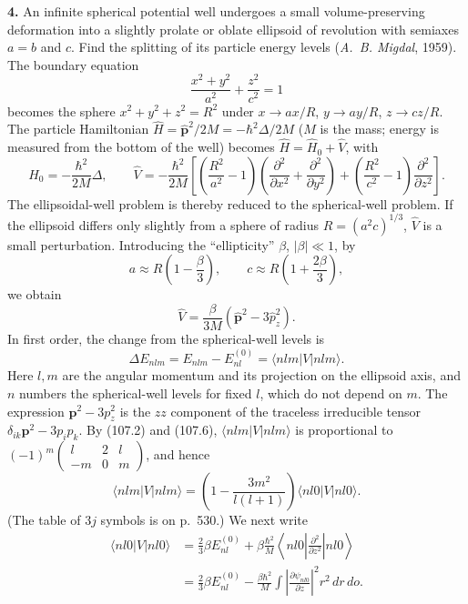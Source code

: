 \textbf{4.} An infinite spherical potential well undergoes a small
volume-preserving deformation into a slightly prolate or oblate ellipsoid of
revolution with semiaxes $a=b$ and $c$. Find the splitting of its particle
energy levels (\emph{A.~B. Migdal}, 1959).
\SolutionHeading The boundary equation
\[
  \frac{x^2+y^2}{a^2}+\frac{z^2}{c^2}=1
\]
becomes the sphere $x^2+y^2+z^2=R^2$ under
$x\to ax/R$, $y\to ay/R$, $z\to cz/R$. The particle Hamiltonian
$\hat H=\hat{\mathbf p}^2/2M=-\hbar^2\Delta/2M$ ($M$ is the mass; energy is
measured from the bottom of the well) becomes $\hat H=\hat H_0+\hat V$, with
\[
  \hat H_0=-\frac{\hbar^2}{2M}\Delta,\qquad
  \hat V=-\frac{\hbar^2}{2M}\left[
   \left(\frac{R^2}{a^2}-1\right)
      \left(\frac{\partial^2}{\partial x^2}+\frac{\partial^2}{\partial y^2}\right)
   +\left(\frac{R^2}{c^2}-1\right)\frac{\partial^2}{\partial z^2}
  \right].
\]
The ellipsoidal-well problem is thereby reduced to the spherical-well
problem. If the ellipsoid differs only slightly from a sphere of radius
$R=(a^2c)^{1/3}$, $\hat V$ is a small perturbation. Introducing the
``ellipticity'' $\beta$, $|\beta|\ll1$, by
\[
  a\approx R\left(1-\frac\beta3\right),\qquad
  c\approx R\left(1+\frac{2\beta}3\right),
\]
we obtain
\[
  \hat V=\frac\beta{3M}(\hat{\mathbf p}^2-3\hat p_z^2).
\]
In first order, the change from the spherical-well levels is
\[
  \Delta E_{nlm}=E_{nlm}-E_{nl}^{(0)}=\langle nlm|V|nlm\rangle.
\]
Here $l,m$ are the angular momentum and its projection on the ellipsoid axis,
and $n$ numbers the spherical-well levels for fixed $l$, which do not depend
on $m$. The expression $\mathbf p^2-3p_z^2$ is the $zz$ component of the
traceless irreducible tensor $\delta_{ik}\mathbf p^2-3p_ip_k$. By (107.2)
and (107.6), $\langle nlm|V|nlm\rangle$ is proportional to
$(-1)^m\begin{pmatrix}l&2&l\\-m&0&m\end{pmatrix}$, and hence
\[
  \langle nlm|V|nlm\rangle
  =\left(1-\frac{3m^2}{l(l+1)}\right)\langle nl0|V|nl0\rangle.
\]
(The table of $3j$ symbols is on p.~530.) We next write
\[
 \begin{aligned}
  \langle nl0|V|nl0\rangle
  &=\frac23\beta E_{nl}^{(0)}
    +\beta\frac{\hbar^2}{M}
      \left\langle nl0\left|\frac{\partial^2}{\partial z^2}\right|nl0\right\rangle\\
  &=\frac23\beta E_{nl}^{(0)}
    -\frac{\beta\hbar^2}{M}\int
      \left|\frac{\partial\psi_{nl0}}{\partial z}\right|^2r^2\,dr\,do.
 \end{aligned}
\]
